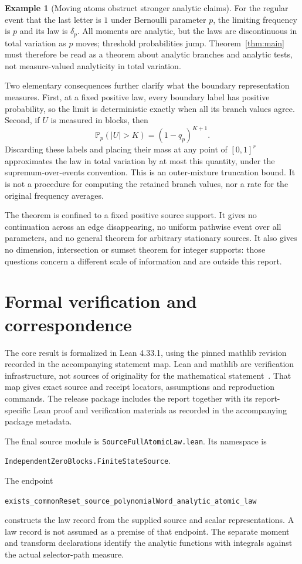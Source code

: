 \documentclass[11pt]{article}
\theoremstyle{definition}
\newtheorem{example}[theorem]{Example}
\theoremstyle{remark}
\newcommand{\PP}{\mathbb P}
\newcommand{\code}[1]{{\small\nolinkurl{#1}}}
\begin{document}
\begin{example}[Moving atoms obstruct stronger analytic claims]
For the regular event that the last letter is $1$ under Bernoulli parameter $p$, the limiting frequency is $p$ and its law is $\delta_p$. All moments are analytic, but the laws are discontinuous in total variation as $p$ moves; threshold probabilities jump. Theorem~\ref{thm:main} must therefore be read as a theorem about analytic branches and analytic tests, not measure-valued analyticity in total variation.
\end{example}

Two elementary consequences further clarify what the boundary representation measures. First, at a fixed positive law, every boundary label has positive probability, so the limit is deterministic exactly when all its branch values agree. Second, if $U$ is measured in blocks, then
\[
 \PP_p(|U|>K)=(1-q_p)^{K+1}.
\]
Discarding these labels and placing their mass at any point of $[0,1]^r$ approximates the law in total variation by at most this quantity, under the supremum-over-events convention. This is an outer-mixture truncation bound. It is not a procedure for computing the retained branch values, nor a rate for the original frequency averages.

The theorem is confined to a fixed positive source support. It gives no continuation across an edge disappearing, no uniform pathwise event over all parameters, and no general theorem for arbitrary stationary sources. It also gives no dimension, intersection or sumset theorem for integer supports: those questions concern a different scale of information and are outside this report.

\section{Formal verification and correspondence}\label{sec:formal}
The core result is formalized in Lean 4.33.1, using the pinned mathlib revision recorded in the accompanying statement map. Lean and mathlib are verification infrastructure, not sources of originality for the mathematical statement~\cite{Lean4,Mathlib}. That map gives exact source and receipt locators, assumptions and reproduction commands. The release package includes the report together with its report-specific Lean proof and verification materials as recorded in the accompanying package metadata.

The final source module is \code{SourceFullAtomicLaw.lean}. Its namespace is
\begin{center}
\code{IndependentZeroBlocks.FiniteStateSource}.
\end{center}
The endpoint
\begin{center}
\code{exists_commonReset_source_polynomialWord_analytic_atomic_law}
\end{center}
constructs the law record from the supplied source and scalar representations. A law record is not assumed as a premise of that endpoint. The separate moment and transform declarations identify the analytic functions with integrals against the actual selector-path measure.
\end{document}
